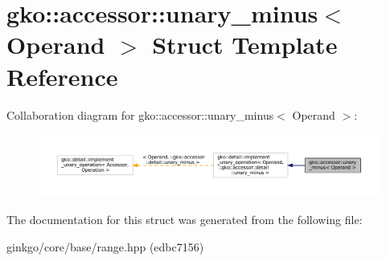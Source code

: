 \hypertarget{structgko_1_1accessor_1_1unary__minus}{}\section{gko\+:\+:accessor\+:\+:unary\+\_\+minus$<$ Operand $>$ Struct Template Reference}
\label{structgko_1_1accessor_1_1unary__minus}


Collaboration diagram for gko\+:\+:accessor\+:\+:unary\+\_\+minus$<$ Operand $>$\+:
\nopagebreak
\begin{figure}[H]
\begin{center}
\leavevmode
\includegraphics[width=350pt]{structgko_1_1accessor_1_1unary__minus__coll__graph}
\end{center}
\end{figure}


The documentation for this struct was generated from the following file\+:\begin{DoxyCompactItemize}
\item 
ginkgo/core/base/range.\+hpp (edbc7156)\end{DoxyCompactItemize}
